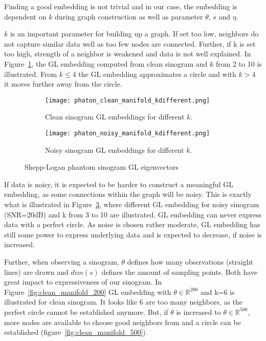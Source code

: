 Finding a good embedding is not trivial and in our case, the embedding is dependent on $k$ during graph construction
as well as parameter $\theta$, $s$ and $\eta$.

$k$ is an important parameter for building up a graph. If set too low, neighbors
do not capture similar data well as too few nodes are connected. 
Further, if k is set too high, strength of a neighbor 
is weakened and data is not well explained.
In Figure~\ref{fig:clean_manifolds}, the GL embedding computed from clean sinogram and $k$ from 2 to 10 is illustrated.
From $k \leq 4$ the GL embedding approximates a circle and with $k >  4$ it moves further away from the circle. 


\begin{figure}[H]
    \captionsetup[subfigure]{justification=centering}
    \centering
    \begin{subfigure}[t]{0.45\textwidth}
        \texttt{[image: phaton\_clean\_manifold\_kdifferent.png]}
        \caption{Clean sinogram GL embeddings for different $k$.}
        \label{fig:clean_manifolds}
    \end{subfigure}\hfill
    \begin{subfigure}[t]{0.45\textwidth}
      \texttt{[image: phaton\_noisy\_manifold\_kdifferent.png]}
      \caption{Noisy sinogram GL embeddings for different $k$.}
      \label{fig:noisy_manifolds}
    \end{subfigure}\hfill
    \caption{Shepp-Logan phantom sinogram GL eigenvectors}
  \end{figure}

If data is noisy, it is expected to be harder to construct a meaningful GL embedding, as some connections within
the graph will be noisy. This is exactly what is illustrated in Figure~\ref{fig:noisy_manifolds}, where 
different GL embedding for noisy sinogram (SNR=20dB) and k from 3 to 10 are illustrated.
GL embedding can never express data with a perfect circle. As noise is chosen rather moderate, GL embedding has still some 
power to express underlying data and is expected to decrease, if noise is increased.


Further, when observing a sinogram, $\theta$ defines how many observations (straight lines) are drawn
and $dim(s)$ defines the amount of sampling points. Both have great impact to expressiveness of our sinogram.
In Figure~\ref{fig:clean_manifold_200} GL embedding with $\theta \in \mathbb{R}^{200}$ and k=6 is illustrated
for clean sinogram. It looks like 6 are too many neighbors, as the perfect circle cannot be established anymore.
But, if $\theta$ is increased to $\theta \in \mathbb{R}^{500}$, more nodes are available to choose good neighbors from
and a circle can be established (figure~\ref{fig:clean_manifold_500}).


